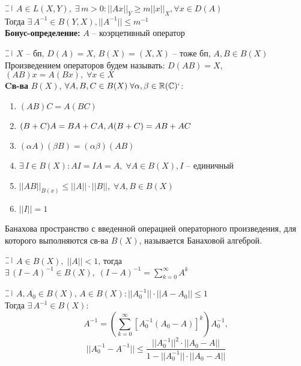 \begin{theorem}
  $\letus$ $A \in L(X, Y), \; \exists \, m > 0: ||Ax||_Y \ge m||x||_X, \forall x \in D(A)$\\
  Тогда $\exists \, A^{-1} \in B(Y, X), ||A^{-1}|| \le m^{-1}$\\
  {\bf Бонус-определение:} $A$ -- коэрцетивный оператор
\end{theorem}

\begin{definition}
  $\letus$ $X$ -- бп, $D(A) = X$, $B(X) = (X, X)$ -- тоже бп, $A, B \in B(X)$\\
  Произведением операторов будем называть: $D(AB) = X$, $(AB)x = A(Bx), \; \forall x \in X$\\
  {\bf Cв-ва} $B(X)$, $\forall A, B, C \in B(X) \; \forall \alpha, \beta \in  \mathbb{R}(\mathbb{C})`$:
  \begin{enumerate}
    \item $(AB)C = A(BC)$
    \item $(B+C)A = BA+CA, \; \\ A(B+C) = AB+AC$
    \item $(\alpha A)(\beta B) = (\alpha\beta)(AB)$
    \item $\exists \, I \in B(X): AI = IA = A, \; \forall A \in B(X), I$ -- единичный
    \item $||AB||_{B(x)} \le ||A|| \cdot ||B||, \; \forall A, B \in B(X)$
    \item $||I|| = 1$
  \end{enumerate}
\end{definition}

\begin{definition}
  Банахова пространство с введенной операцией операторного произведения, для которого выполняются св-ва $B(X)$, называется 
  Банаховой алгеброй.
\end{definition}


\begin{theorem}
  $\letus$ $A \in B(X), \; ||A|| < 1$, тогда $\exists \, (I - A)^{-1} \in B(X), \; (I - A)^{-1} = \sum\limits_{k=0}^{\infty} A^k$
\end{theorem}

\begin{theorem}
  $\letus$ $A, A_0 \in B(X), \, A \in B(X): ||A_0^{-1}|| \cdot ||A - A_0|| \le 1$\\
  Тогда $\exists \, A^{-1} \in B(X)$:
  $$ A^{-1} = \left(\sum\limits_{k=0}^{\infty}[A_0^{-1}(A_0 - A)]^k\right)A_0^{-1},$$ 
  $$||A_0^{-1} - A^{-1}|| \le \frac{||A_0^{-1}||^2 \cdot ||A_0 - A||}{1 - ||A_0^{-1}|| \cdot ||A_0 - A||}$$
\end{theorem}

